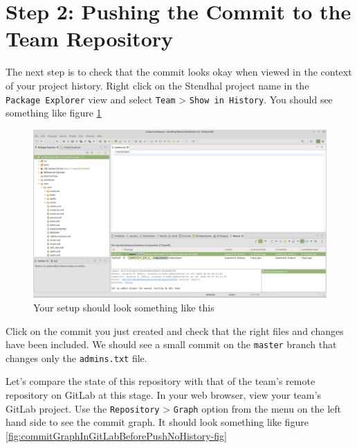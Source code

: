 \documentclass[
]{book}
\begin{document}
\hypertarget{pushing}{%
\section{Step 2: Pushing the Commit to the Team Repository}\label{pushing}}

The next step is to check that the commit looks okay when viewed in the context of your project history. Right click on the Stendhal project name in the \texttt{Package\ Explorer} view and select \texttt{Team} \textgreater{} \texttt{Show\ in\ History}. You should see something like figure \ref{fig:localCommitGraphBeforePushNoHistory-fig}

\begin{figure}

{\centering \includegraphics[width=1\linewidth]{images/localCommitGraphBeforePushNoHistory} 

}

\caption{Your setup should look something like this}\label{fig:localCommitGraphBeforePushNoHistory-fig}
\end{figure}

Click on the commit you just created and check that the right files and changes have been included. We should see a small commit on the \texttt{master} branch that changes only the \texttt{admins.txt} file.

Let's compare the state of this repository with that of the team's remote repository on GitLab at this stage. In your web browser, view your team's GitLab project. Use the \texttt{Repository} \textgreater{} \texttt{Graph} option from the menu on the left hand side to see the commit graph. It should look something like figure \ref{fig:commitGraphInGitLabBeforePushNoHistory-fig}
\end{document}
